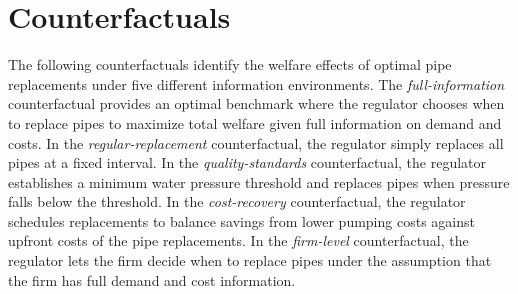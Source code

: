 \documentclass[12pt,table]{article}
\begin{document}
\section{Counterfactuals}



The following counterfactuals identify the welfare effects of optimal pipe replacements under five different information environments.  The \textit{full-information} counterfactual provides an optimal benchmark where the regulator chooses when to replace pipes to maximize total welfare given full information on demand and costs.  In the \textit{regular-replacement} counterfactual, the regulator simply replaces all pipes at a fixed interval.  In the \textit{quality-standards} counterfactual, the regulator establishes a minimum water pressure threshold and replaces pipes when pressure falls below the threshold.  In the \textit{cost-recovery} counterfactual, the regulator schedules replacements to balance savings from lower pumping costs against upfront costs of the pipe replacements.  In the \textit{firm-level} counterfactual, the regulator lets the firm decide when to replace pipes under the assumption that the firm has full demand and cost information.



\end{document}
